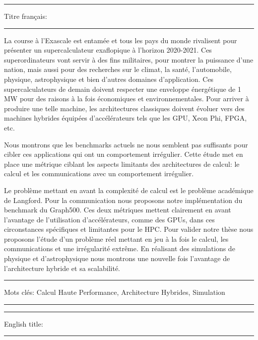 \hrule
\vspace{.2cm}
Titre français: \textbf{\phdTitleFR}
\vspace{.2cm}
\hrule
\vspace{.3cm}

La course à l'Exascale est entamée et tous les pays du monde rivalisent pour présenter un supercalculateur exaflopique à l'horizon 2020-2021. 
Ces superordinateurs vont servir à des fins militaires, pour montrer la puissance d'une nation, mais aussi pour des recherches sur le climat, la santé, l'automobile, physique, astrophysique et bien d'autres domaines d'application. 
Ces supercalculateurs de demain doivent respecter une enveloppe énergétique de 1 MW pour des raisons à la fois économiques et environnementales. 
Pour arriver à produire une telle machine, les architectures classiques doivent évoluer vers des machines hybrides équipées d'accélérateurs tels que les GPU, Xeon Phi, FPGA, etc. 

Nous montrons que les benchmarks actuels ne nous semblent pas suffisants pour cibler ces applications qui ont un comportement irrégulier. 
Cette étude met en place une métrique ciblant les aspects limitants des architectures de calcul: le calcul et les communications avec un comportement irrégulier. 

Le problème mettant en avant la complexité de calcul est le problème académique de Langford. 
Pour la communication nous proposons notre implémentation du benchmark du Graph500.
Ces deux métriques mettent clairement en avant l'avantage de l'utilisation d'accélérateurs, comme des GPUs, dans ces circonstances spécifiques et limitantes pour le HPC. 
Pour valider notre thèse nous proposons l'étude d'un problème réel mettant en jeu à la fois le calcul, les communications et une irrégularité extrême. 
En réalisant des simulations de physique et d'astrophysique nous montrons une nouvelle fois l'avantage de l'architecture hybride et sa scalabilité. 

\vspace{.3cm}
\hrule
\vspace{.1cm}

{
\small
Mots clés: Calcul Haute Performance, Architecture Hybrides, Simulation
}

\vspace{.1cm}
\hrule

\vspace{.4cm}
\hrule
\vspace{.2cm}
English title: \textbf{\phdTitleEN}
\vspace{.2cm}
\hrule
\vspace{.3cm}

